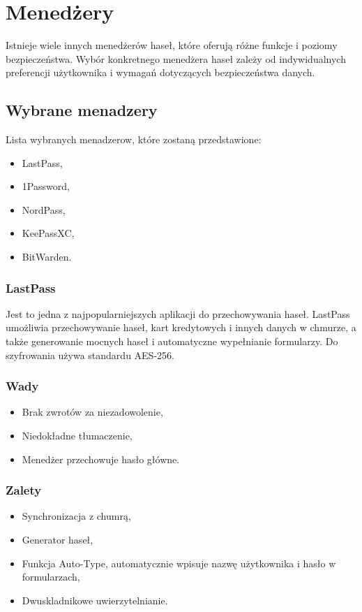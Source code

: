 \section{Menedżery}
Istnieje wiele innych menedżerów haseł, które oferują różne funkcje i poziomy bezpieczeństwa. Wybór konkretnego menedżera haseł zależy od indywidualnych preferencji użytkownika i wymagań dotyczących bezpieczeństwa danych.

\subsection{Wybrane menadzery}
Lista wybranych menadzerow, które zostaną przedstawione:
\begin{itemize}
    \item LastPass,
    \item 1Password,
    \item NordPass,
    \item KeePassXC,
    \item BitWarden.
\end{itemize}

\subsubsection{LastPass}
Jest to jedna z najpopularniejszych aplikacji do przechowywania haseł. LastPass umożliwia przechowywanie haseł, kart kredytowych i innych danych w chmurze, a także generowanie mocnych haseł i automatyczne wypełnianie formularzy. Do szyfrowania używa standardu AES-256.
\subsubsection{Wady}
\begin{itemize}
    \item Brak zwrotów za niezadowolenie,
    \item Niedokładne tłumaczenie,
    \item Menedżer przechowuje hasło główne.
\end{itemize}
\subsubsection{Zalety}
\begin{itemize}
    \item Synchronizacja z chumrą,
    \item Generator haseł,
    \item Funkcja Auto-Type, automatycznie wpisuje nazwę użytkownika i hasło w formularzach,
    \item Dwuskladnikowe uwierzytelnianie.
\end{itemize}

